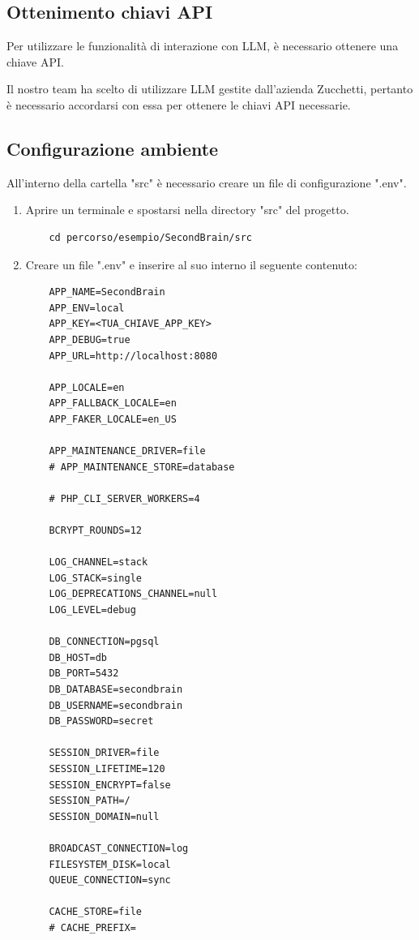 \documentclass[a4paper,10pt]{article}
\begin{document}
\subsection{Ottenimento chiavi API}
Per utilizzare le funzionalità di interazione con LLM, è necessario ottenere una chiave API.

Il nostro team ha scelto di utilizzare LLM gestite dall'azienda Zucchetti, pertanto è necessario accordarsi con essa per ottenere le chiavi API necessarie.

\subsection{Configurazione ambiente}
All'interno della cartella "src" è necessario creare un file di configurazione ".env".
\begin{enumerate}
  \item Aprire un terminale e spostarsi nella directory "src" del progetto.
  
  \begin{lstlisting}
    cd percorso/esempio/SecondBrain/src
  \end{lstlisting}

  \item Creare un file ".env" e inserire al suo interno il seguente contenuto:
  
  \begin{lstlisting}
    APP_NAME=SecondBrain
    APP_ENV=local
    APP_KEY=<TUA_CHIAVE_APP_KEY>
    APP_DEBUG=true
    APP_URL=http://localhost:8080

    APP_LOCALE=en
    APP_FALLBACK_LOCALE=en
    APP_FAKER_LOCALE=en_US

    APP_MAINTENANCE_DRIVER=file
    # APP_MAINTENANCE_STORE=database

    # PHP_CLI_SERVER_WORKERS=4

    BCRYPT_ROUNDS=12

    LOG_CHANNEL=stack
    LOG_STACK=single
    LOG_DEPRECATIONS_CHANNEL=null
    LOG_LEVEL=debug

    DB_CONNECTION=pgsql
    DB_HOST=db
    DB_PORT=5432
    DB_DATABASE=secondbrain
    DB_USERNAME=secondbrain
    DB_PASSWORD=secret

    SESSION_DRIVER=file
    SESSION_LIFETIME=120
    SESSION_ENCRYPT=false
    SESSION_PATH=/
    SESSION_DOMAIN=null

    BROADCAST_CONNECTION=log
    FILESYSTEM_DISK=local
    QUEUE_CONNECTION=sync

    CACHE_STORE=file
    # CACHE_PREFIX=


\end{lstlisting}
\end{enumerate}
\end{document}
